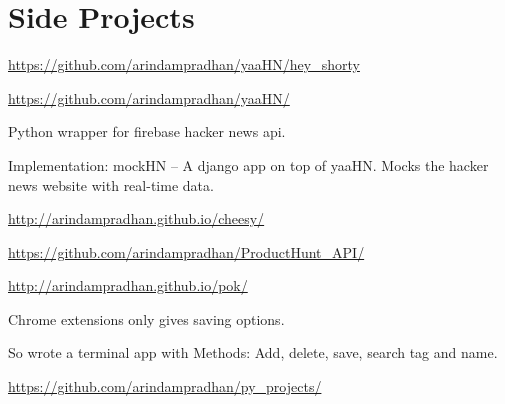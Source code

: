 \documentclass[]{deedy-resume-openfont}
\begin{document}
\begin{minipage}[t]{0.66\textwidth}

\section{Side Projects}

{ \url{https://github.com/arindampradhan/yaaHN/hey_shorty} }\\
\sectionsep

{ \url{https://github.com/arindampradhan/yaaHN/} }\\
\begin{tightemize}
\item Python wrapper for firebase hacker news api.\item Implementation: mockHN – A django app on top of yaaHN. Mocks the hacker news website with real-time data.\end{tightemize}
\sectionsep

{ \url{http://arindampradhan.github.io/cheesy/} }\\
\sectionsep

{ \url{https://github.com/arindampradhan/ProductHunt_API/} }\\
\sectionsep

{ \url{http://arindampradhan.github.io/pok/} }\\
\begin{tightemize}
\item Chrome extensions only gives saving options.\item So wrote a terminal app with Methods: Add, delete, save, search tag and name.\end{tightemize}
\sectionsep

{ \url{https://github.com/arindampradhan/py_projects/} }\\
\sectionsep



\end{minipage}
\end{document}
